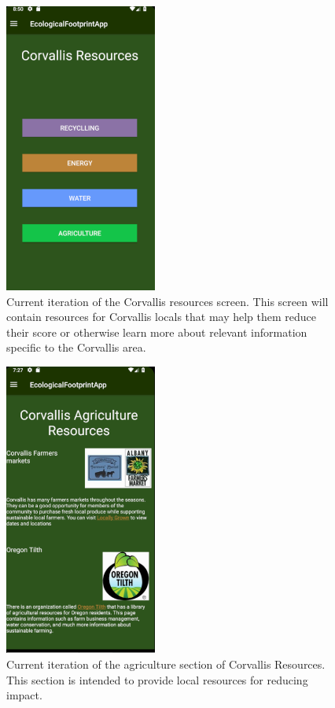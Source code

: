 \documentclass[onecolumn, draftclsnofoot,10pt, compsoc, tikz]{IEEEtran}
\begin{document}
\begin{figure}[h!]
\centering
\includegraphics[width=50mm]{CorvallisIter1.png}
\caption{Current iteration of the Corvallis resources screen. This screen will contain resources for Corvallis locals that may help them reduce their score or otherwise learn more about relevant information specific to the Corvallis area.}
\label{fig:method}
\end{figure}

\begin{figure}[h!]
\centering
\includegraphics[width=50mm]{AgricultureResources.png}
\caption{Current iteration of the agriculture section of Corvallis Resources. This section is intended to provide local resources for reducing impact.}
\label{fig:method}
\end{figure}
\end{document}
